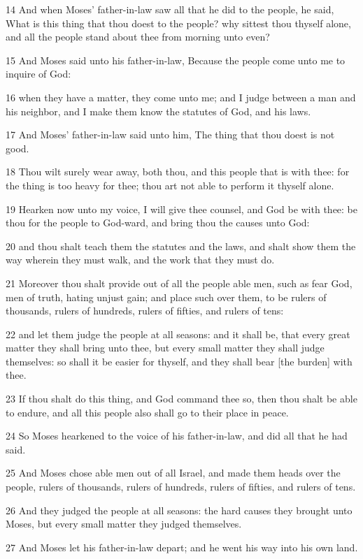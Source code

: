 \par 14 And when Moses' father-in-law saw all that he did to the people, he said, What is this thing that thou doest to the people? why sittest thou thyself alone, and all the people stand about thee from morning unto even?
\par 15 And Moses said unto his father-in-law, Because the people come unto me to inquire of God:
\par 16 when they have a matter, they come unto me; and I judge between a man and his neighbor, and I make them know the statutes of God, and his laws.
\par 17 And Moses' father-in-law said unto him, The thing that thou doest is not good.
\par 18 Thou wilt surely wear away, both thou, and this people that is with thee: for the thing is too heavy for thee; thou art not able to perform it thyself alone.
\par 19 Hearken now unto my voice, I will give thee counsel, and God be with thee: be thou for the people to God-ward, and bring thou the causes unto God:
\par 20 and thou shalt teach them the statutes and the laws, and shalt show them the way wherein they must walk, and the work that they must do.
\par 21 Moreover thou shalt provide out of all the people able men, such as fear God, men of truth, hating unjust gain; and place such over them, to be rulers of thousands, rulers of hundreds, rulers of fifties, and rulers of tens:
\par 22 and let them judge the people at all seasons: and it shall be, that every great matter they shall bring unto thee, but every small matter they shall judge themselves: so shall it be easier for thyself, and they shall bear [the burden] with thee.
\par 23 If thou shalt do this thing, and God command thee so, then thou shalt be able to endure, and all this people also shall go to their place in peace.
\par 24 So Moses hearkened to the voice of his father-in-law, and did all that he had said.
\par 25 And Moses chose able men out of all Israel, and made them heads over the people, rulers of thousands, rulers of hundreds, rulers of fifties, and rulers of tens.
\par 26 And they judged the people at all seasons: the hard causes they brought unto Moses, but every small matter they judged themselves.
\par 27 And Moses let his father-in-law depart; and he went his way into his own land.

